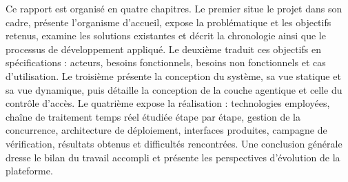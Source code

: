 Ce rapport est organisé en quatre chapitres. Le premier situe le projet dans son cadre, présente l'organisme d'accueil, expose la problématique et les objectifs retenus, examine les solutions existantes et décrit la chronologie ainsi que le processus de développement appliqué. Le deuxième traduit ces objectifs en spécifications : acteurs, besoins fonctionnels, besoins non fonctionnels et cas d'utilisation. Le troisième présente la conception du système, sa vue statique et sa vue dynamique, puis détaille la conception de la couche agentique et celle du contrôle d'accès. Le quatrième expose la réalisation : technologies employées, chaîne de traitement temps réel étudiée étape par étape, gestion de la concurrence, architecture de déploiement, interfaces produites, campagne de vérification, résultats obtenus et difficultés rencontrées. Une conclusion générale dresse le bilan du travail accompli et présente les perspectives d'évolution de la plateforme.
